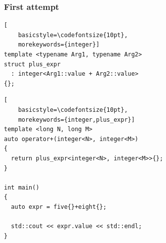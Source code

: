 \documentclass[14pt]{beamer}
\begin{document}
\begin{frame}

  \nointerlineskip
  
\end{frame}

\begin{frame}[fragile]
  \frametitle{First attempt}

  \begin{lstlisting}[
    basicstyle=\codefontsize{10pt},
    morekeywords={integer}]
template <typename Arg1, typename Arg2>
struct plus_expr
  : integer<Arg1::value + Arg2::value>
{};
  \end{lstlisting}

  \begin{lstlisting}[
    basicstyle=\codefontsize{10pt},
    morekeywords={integer,plus_expr}]
template <long N, long M>
auto operator+(integer<N>, integer<M>)
{
  return plus_expr<integer<N>, integer<M>>{};
}

int main()
{
  auto expr = five{}+eight{};

  std::cout << expr.value << std::endl;
}
  \end{lstlisting}

\end{frame}
\end{document}

